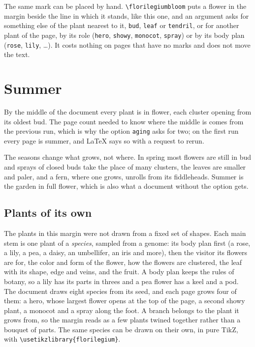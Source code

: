 \documentclass[11pt,a4paper]{article}
\newcommand\code[1]{\texttt{\small #1}}
\begin{document}
The same mark can be placed by hand. \code{\textbackslash florilegiumbloom} puts a flower
in the margin beside the line in which it stands, like this
one\florilegiumbloom, and an argument asks for something else of the plant nearest to it,
\code{bud}, \code{leaf} or \code{tendril}, or for another plant of the page, by its role
(\code{hero}, \code{showy}, \code{monocot}, \code{spray}) or by its body plan
(\code{rose}, \code{lily}, \dots). It costs nothing on pages that have no marks and does
not move the text.

\section{Summer}

By the middle of the document every plant is in flower, each cluster opening from its oldest
bud. The page count needed to know where the
middle is comes from the previous run, which is why the option \code{aging} asks for two;
on the first run every page is summer, and LaTeX says so with a request to rerun.

The seasons change what grows, not where. In spring most flowers are still in bud and sprays
of closed buds take the place of many clusters, the leaves are smaller and paler, and a fern,
where one grows, unrolls from its fiddleheads. Summer is the garden in full flower, which is also what a
document without the option gets.

\subsection{Plants of its own}

The plants in this margin were not drawn from a fixed set of shapes. Each main stem is one
plant of a \emph{species}, sampled from a genome: its body plan first (a rose, a lily, a
pea, a daisy, an umbellifer, an iris and more), then the visitor its flowers are for, the
color and form of the flower, how the flowers are clustered, the leaf with its shape, edge
and veins, and the fruit. A body plan keeps the rules of botany, so a lily has its parts in
threes and a pea flower has a keel and a pod. The document draws eight species from its
seed, and each page grows four of them: a hero, whose largest flower opens at the top of the
page, a second showy plant, a monocot and a spray along the foot. A branch belongs to the
plant it grows from, so the margin reads as a few plants twined together rather than a
bouquet of parts. The same species can be drawn on their own, in pure TikZ, with
\code{\textbackslash usetikzlibrary\{florilegium\}}.
\end{document}
